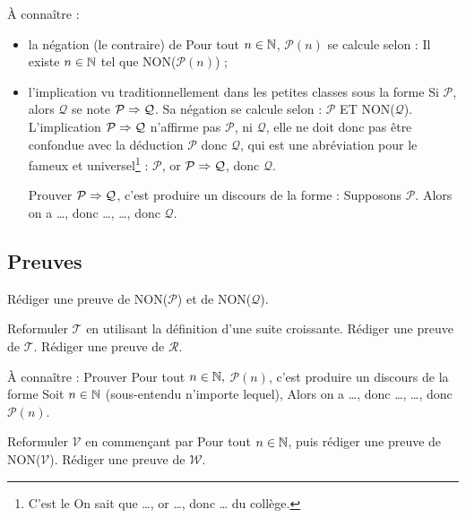 \documentclass[a4paper,11pt,DIV18,BCOR0mm]{scrartcl}
\newcommand{\aconnaitre}[1]{{\tiny{À connaître : #1}\par}}
\begin{document}
\aconnaitre{
\begin{itemize}
 
 \item la négation (le contraire) de \og Pour tout $n\in\mathbb{N}$, $\mathcal{P}(n)$\fg{}
se calcule selon : \og Il existe $n\in\mathbb{N}$ tel que NON($\mathcal{P}(n)$)\fg{} ;
 
 \item l'implication vu traditionnellement dans les petites classes sous la forme
\og Si $\mathcal{P}$, alors $\mathcal{Q}$\fg{} se note \og$\mathcal{P}\Rightarrow\mathcal{Q}$\fg. Sa négation
se calcule selon : \og$\mathcal{P}$ ET NON($\mathcal{Q}$)\fg. L'implication \og$\mathcal{P}\Rightarrow\mathcal{Q}$\fg{}
n'affirme pas $\mathcal{P}$, ni $\mathcal{Q}$, elle ne doit donc pas être confondue avec la déduction
\og $\mathcal{P}$ donc $\mathcal{Q}$\fg, qui est une abréviation pour le fameux et universel\footnote{C'est le \og
On sait que \dots, or \dots, donc \dots\fg{} du collège.} \latin{modus ponens} : \og $\mathcal{P}$, or $\mathcal{P}\Rightarrow\mathcal{Q}$, donc $\mathcal{Q}$\fg.

Prouver \og$\mathcal{P}\Rightarrow\mathcal{Q}$\fg, c'est produire un discours de la forme : \og Supposons $\mathcal{P}$. Alors on a \dots, donc \dots, \dots, donc $\mathcal{Q}$.


\end{itemize}
}

\subsection*{Preuves}
\begin{exercice}
 Rédiger une preuve de NON($\mathcal{P}$) et de NON($\mathcal{Q}$).
\end{exercice}

\begin{exercice}
 Reformuler $\mathcal{T}$ en utilisant la définition d'une suite croissante.
Rédiger une preuve de $\mathcal{T}$. Rédiger une preuve de $\mathcal{R}$.
\end{exercice}

\aconnaitre{Prouver \og Pour tout $n\in\mathbb{N},$ $\mathcal{P}(n)$\fg{},
c'est produire un discours de la forme \og Soit $n\in\mathbb{N}$ (sous-entendu 
n'importe lequel), Alors on a \dots, donc \dots, \dots, donc $\mathcal{P}(n)$\fg{}.
}

\begin{exercice}
 Reformuler $\mathcal{V}$ en commençant par \og Pour tout $n\in\mathbb{N}$\fg, puis rédiger 
une preuve de NON($\mathcal{V}$). Rédiger une preuve de $\mathcal{W}$.
\end{exercice}
\end{document}
